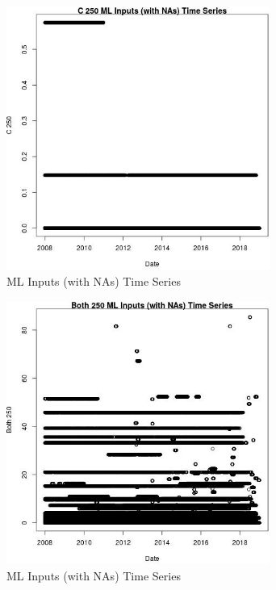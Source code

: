 \begin{figure} 
\centering  
\includegraphics[width=0.77\textwidth]{Code_Outputs/Report_ML_input_PM25_Step4_part_e_de_duplicated_aves_compiled_2019-05-21wNAs_C_250vDate.jpg} 
\caption{\label{fig:Report_ML_input_PM25_Step4_part_e_de_duplicated_aves_compiled_2019-05-21wNAsC_250vDate}ML Inputs (with NAs) Time Series} 
\end{figure} 
 

\begin{figure} 
\centering  
\includegraphics[width=0.77\textwidth]{Code_Outputs/Report_ML_input_PM25_Step4_part_e_de_duplicated_aves_compiled_2019-05-21wNAs_Both_250vDate.jpg} 
\caption{\label{fig:Report_ML_input_PM25_Step4_part_e_de_duplicated_aves_compiled_2019-05-21wNAsBoth_250vDate}ML Inputs (with NAs) Time Series} 
\end{figure} 
 

